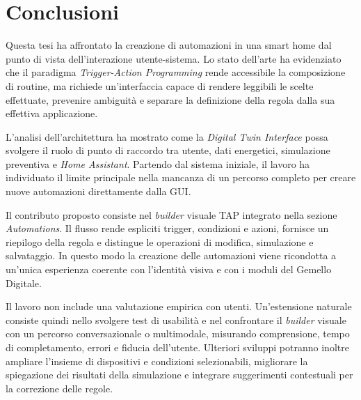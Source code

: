 \chapter{Conclusioni}
Questa tesi ha affrontato la creazione di automazioni in una smart home dal punto di vista dell'interazione utente-sistema. Lo stato dell'arte ha evidenziato che il paradigma \textit{Trigger-Action Programming} rende accessibile la composizione di routine, ma richiede un'interfaccia capace di rendere leggibili le scelte effettuate, prevenire ambiguit\`a e separare la definizione della regola dalla sua effettiva applicazione.

L'analisi dell'architettura ha mostrato come la \textit{Digital Twin Interface} possa svolgere il ruolo di punto di raccordo tra utente, dati energetici, simulazione preventiva e \textit{Home Assistant}. Partendo dal sistema iniziale, il lavoro ha individuato il limite principale nella mancanza di un percorso completo per creare nuove automazioni direttamente dalla GUI.

Il contributo proposto consiste nel \textit{builder} visuale TAP integrato nella sezione \textit{Automations}. Il flusso rende espliciti trigger, condizioni e azioni, fornisce un riepilogo della regola e distingue le operazioni di modifica, simulazione e salvataggio. In questo modo la creazione delle automazioni viene ricondotta a un'unica esperienza coerente con l'identit\`a visiva e con i moduli del Gemello Digitale.

Il lavoro non include una valutazione empirica con utenti. Un'estensione naturale consiste quindi nello svolgere test di usabilit\`a e nel confrontare il \textit{builder} visuale con un percorso conversazionale o multimodale, misurando comprensione, tempo di completamento, errori e fiducia dell'utente. Ulteriori sviluppi potranno inoltre ampliare l'insieme di dispositivi e condizioni selezionabili, migliorare la spiegazione dei risultati della simulazione e integrare suggerimenti contestuali per la correzione delle regole.
